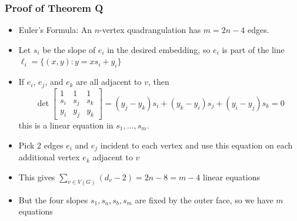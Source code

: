 \documentclass[xcolor=dvipsnames]{beamer}
\begin{document}
\begin{frame}
   \frametitle{Proof of Theorem Q}
   \begin{itemize}[<+->]
     \item Euler's Formula: An $n$-vertex quadrangulation has $m=2n-4$ edges.
     \item Let $s_i$ be the slope of $e_i$ in the desired embedding, so $e_i$ is part of the line $\ell_i = \{(x,y):y=x s_i + y_i\}$
     \item If $e_i$, $e_j$, and $e_k$ are all adjacent to $v$, then
     \[\det\left[\begin{array}{ccc}1&1&1\\s_i&s_j&s_k\\y_i&y_j&y_k\end{array}\right] = (y_j-y_k)s_i + (y_k-y_i)s_j + (y_i-y_j)s_k = 0 \]
     this is a linear equation in $s_1,\ldots,s_m$.
     \item Pick 2 edges $e_i$ and $e_j$ incident to each vertex and use this equation on each additional vertex $e_k$ adjacent to $v$ 
     \item This gives $\sum_{v\in V(G)}(d_v-2) = 2n-8 = m - 4$ linear equations
     \item But the four slopes $s_1,s_a,s_b,s_m$ are fixed by the outer face, so we have $m$ equations
   \end{itemize}
\end{frame}
 
\end{document}
